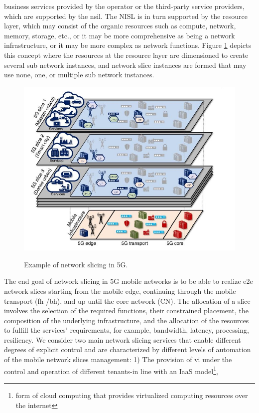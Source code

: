 \documentclass{article}
\begin{document}
business services provided by the operator or the third-party service providers,
which are supported by the \gls{nsil}. The NISL
is in turn supported by the resource layer, which may consist of the organic
resources such as compute, network, memory, storage, etc., or it may be more
comprehensive as being a network infrastructure, or it may be more complex
as network functions. Figure \ref{layers} depicts this concept where the resources at
the resource layer are dimensioned to create several sub network instances,
and network slice instances are formed that may use none, one, or multiple sub
network instances. 
\begin{figure}
\centering
\includegraphics[scale=0.5]{pics/1.JPG}
\label{layers}
\caption{Example of network slicing in 5G.} 
\end{figure}
The end goal of network slicing in 5G mobile networks is to be able to realize
\gls{e2e} network slices starting from the mobile edge, continuing
through the mobile transport (\gls{fh} /\gls{bh}), and up until
the core network (CN). The allocation of a slice involves the selection of the
required functions, their constrained placement, the composition of the underlying infrastructure, and the allocation of the resources to fulfill the services' requirements, for example, bandwidth, latency, processing, resiliency.
We consider two main network slicing services that enable different degrees
of explicit control and are characterized by different levels of automation of the
mobile network slices management:
1) The provision of \gls{vi} under the control and operation
of different tenants-in line with an \gls{IaaS} model\footnote{form of cloud computing that provides virtualized computing resources over the internet},
\end{document}

